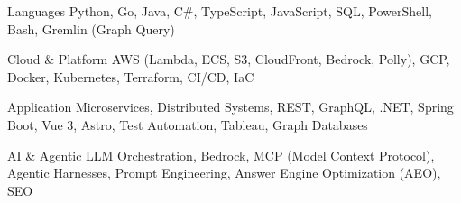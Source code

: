 
\begin{cvskills}

  \cvskill
    {Languages}
    {Python, Go, Java, C\#, TypeScript, JavaScript, SQL, PowerShell, Bash, Gremlin (Graph Query)}

  \cvskill
    {Cloud \& Platform}
    {AWS (Lambda, ECS, S3, CloudFront, Bedrock, Polly), GCP, Docker, Kubernetes, Terraform, CI/CD, IaC}

  \cvskill
    {Application}
    {Microservices, Distributed Systems, REST, GraphQL, .NET, Spring Boot, Vue 3, Astro, Test Automation, Tableau, Graph Databases}

  \cvskill
    {AI \& Agentic}
    {LLM Orchestration, Bedrock, MCP (Model Context Protocol), Agentic Harnesses, Prompt Engineering, Answer Engine Optimization (AEO), SEO}

\end{cvskills}
